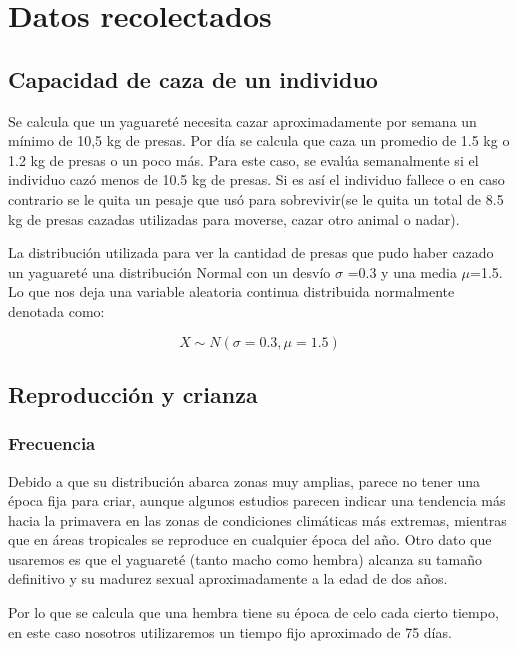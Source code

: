 \section{Datos recolectados}
    \subsection{Capacidad de caza de un individuo}
    Se calcula que un yaguareté necesita cazar aproximadamente por semana un mínimo de 10,5 kg de presas. Por día se calcula que caza un promedio de 1.5 kg o 1.2 kg de presas o un poco más. Para este caso, se evalúa semanalmente si el individuo cazó menos de 10.5 kg de presas. Si es así el individuo fallece o en caso contrario se le quita un pesaje que usó para sobrevivir(se le quita un total de 8.5 kg de presas cazadas utilizadas para moverse, cazar otro animal o nadar).
    
    La distribución utilizada para ver la cantidad de presas que pudo haber cazado un yaguareté una distribución Normal con un desvío $\sigma$ =0.3 y una media $\mu$=1.5. Lo que nos deja una variable aleatoria continua distribuida normalmente denotada como:

    \begin{equation}
        X \sim N(\sigma=0.3, \mu=1.5)
    \end{equation}
    
    \subsection{Reproducción y crianza}
    
        \subsubsection{Frecuencia}
            Debido a que su distribución abarca zonas muy amplias, parece no tener una época fija para criar, aunque algunos estudios parecen indicar una tendencia más hacia la primavera en las zonas de condiciones climáticas más extremas, mientras que en áreas tropicales se reproduce en cualquier época del año. Otro dato que usaremos es que el yaguareté (tanto macho como hembra) alcanza su tamaño definitivo y su madurez sexual aproximadamente a la edad de dos años.
            
            Por lo que se calcula que una hembra tiene su época de celo cada cierto tiempo, en este caso nosotros utilizaremos un tiempo fijo aproximado de 75 días.
            
